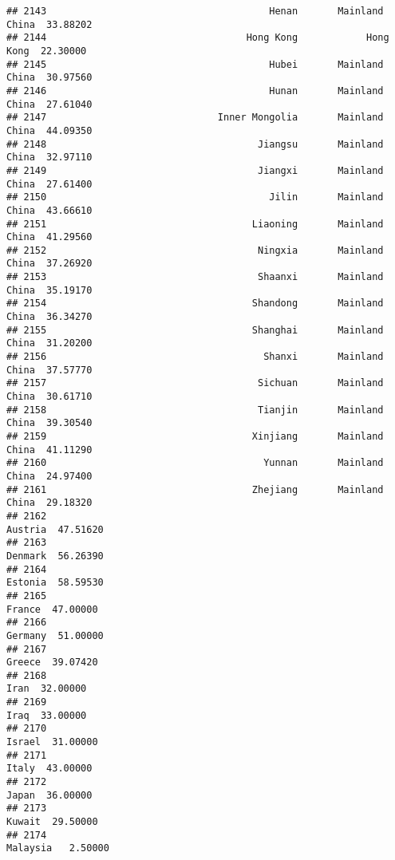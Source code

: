 \documentclass[
]{article}
\begin{document}
\begin{verbatim}
## 2143                                       Henan       Mainland China  33.88202
## 2144                                   Hong Kong            Hong Kong  22.30000
## 2145                                       Hubei       Mainland China  30.97560
## 2146                                       Hunan       Mainland China  27.61040
## 2147                              Inner Mongolia       Mainland China  44.09350
## 2148                                     Jiangsu       Mainland China  32.97110
## 2149                                     Jiangxi       Mainland China  27.61400
## 2150                                       Jilin       Mainland China  43.66610
## 2151                                    Liaoning       Mainland China  41.29560
## 2152                                     Ningxia       Mainland China  37.26920
## 2153                                     Shaanxi       Mainland China  35.19170
## 2154                                    Shandong       Mainland China  36.34270
## 2155                                    Shanghai       Mainland China  31.20200
## 2156                                      Shanxi       Mainland China  37.57770
## 2157                                     Sichuan       Mainland China  30.61710
## 2158                                     Tianjin       Mainland China  39.30540
## 2159                                    Xinjiang       Mainland China  41.11290
## 2160                                      Yunnan       Mainland China  24.97400
## 2161                                    Zhejiang       Mainland China  29.18320
## 2162                                                          Austria  47.51620
## 2163                                                          Denmark  56.26390
## 2164                                                          Estonia  58.59530
## 2165                                                           France  47.00000
## 2166                                                          Germany  51.00000
## 2167                                                           Greece  39.07420
## 2168                                                             Iran  32.00000
## 2169                                                             Iraq  33.00000
## 2170                                                           Israel  31.00000
## 2171                                                            Italy  43.00000
## 2172                                                            Japan  36.00000
## 2173                                                           Kuwait  29.50000
## 2174                                                         Malaysia   2.50000

\end{verbatim}
\end{document}
